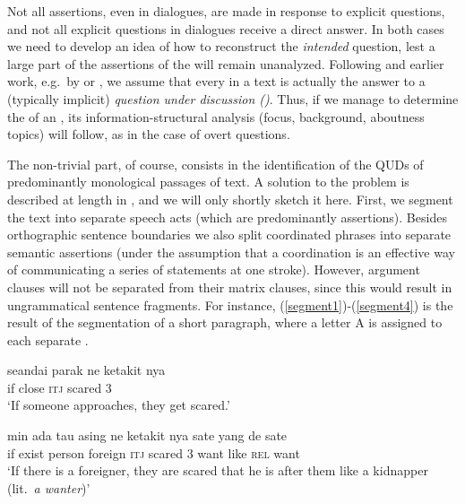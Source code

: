 \documentclass[output=paper
,modfonts
,nonflat]{langsci/langscibook}
\begin{document}
Not all assertions, even in dialogues, are made in response to explicit questions, and not all explicit questions in dialogues receive a direct answer. In both cases we need to develop an idea of how to reconstruct the \textit{intended} question, lest a large part of the assertions of the  will remain unanalyzed.
Following \citet{robcr12} and earlier work, e.g.\ by \citet{stuch89} or \citet{kupja95}, we assume that every  in a text is actually the answer to a (typically implicit) \textit{question under discussion ()}. Thus, if we manage to determine the  of an , its information-structural analysis (focus, background, aboutness topics) will follow, as in the case of overt questions. 

The non-trivial part, of course, consists in the identification of the QUDs of predominantly monological passages of text. A solution to the problem is described at length in \citet{riear17b}, and we will only shortly sketch it here. First, we segment the text into separate speech acts (which are predominantly assertions). Besides orthographic sentence boundaries we also split coordinated phrases into separate semantic assertions (under the assumption that a coordination is an effective way of communicating a series of statements at one stroke). However, argument clauses will not be separated from their matrix clauses, since this would result in ungrammatical sentence fragments. For instance, (\ref{segment1})-(\ref{segment4}) is the result of the segmentation of a short paragraph, where a letter A is assigned to each separate .

\begin{exe}
	\ex\label{segment1}
	\begin{xlist}
		\gll seandai	parak	ne	ketakit	nya\\
		if	close	\textsc{itj}	scared	3\\
		\glt `If someone approaches, they get scared.'
	\end{xlist}
\end{exe}

\begin{exe}
	\ex\label{segment2}
	\begin{xlist}
		\exi{A:}
		\gll min	ada	tau	asing	ne	ketakit	nya	sate	yang de	sate\\
		if	exist	person	foreign	\textsc{itj}	scared	3	want	like \textsc{rel}	want\\
		\glt `If there is a foreigner, they are scared that he is after them like a	kidnapper (lit.\ \textit{a wanter})'
	\end{xlist}
\end{exe}
\end{document}
